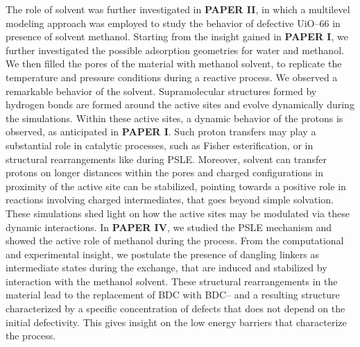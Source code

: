 The role of solvent was further investigated in \textbf{PAPER II}, in which a multilevel modeling approach was employed to study the behavior of defective UiO--66 in presence of solvent methanol. Starting from the insight gained in \textbf{PAPER I}, we further investigated the possible adsorption geometries for water and methanol. We then filled the pores of the material with methanol solvent, to replicate the temperature and pressure conditions during a reactive process. We observed a remarkable behavior of the solvent. Supramolecular structures formed by hydrogen bonds are formed around the active sites and evolve dynamically during the simulations. Within these active sites, a dynamic behavior of the protons is observed, as anticipated in \textbf{PAPER I}. Such proton transfers may play a substantial role in catalytic processes, such as Fisher esterification, or in structural rearrangements like during PSLE. Moreover, solvent can transfer protons on longer distances within the pores and charged configurations in proximity of the active site can be stabilized, pointing towards a positive role in reactions involving charged intermediates, that goes beyond simple solvation. These simulations shed light on how the active sites may be modulated via these dynamic interactions. 
\npar
In \textbf{PAPER IV}, we studied the PSLE mechanism and showed the active role of methanol during the process. From the computational and experimental insight, we postulate the presence of dangling linkers as intermediate states during the exchange, that are induced and stabilized by interaction with the methanol solvent. These structural rearrangements in the material lead to the replacement of BDC with BDC-- and a resulting structure characterized by a specific concentration of defects that does not depend on the initial defectivity. This gives insight on the low energy barriers that characterize the process.
\npar
